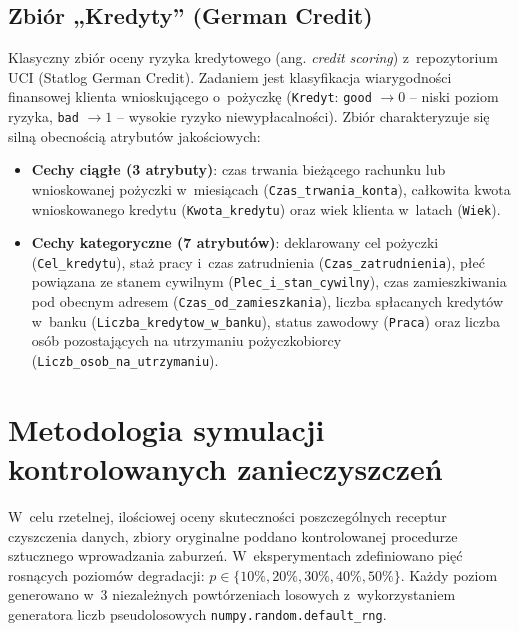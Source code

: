 \subsection{Zbiór „Kredyty” (German Credit)}
Klasyczny zbiór oceny ryzyka kredytowego (ang. \textit{credit scoring}) z~repozytorium UCI \cite{DuaGraff2017} (Statlog German Credit). Zadaniem jest klasyfikacja wiarygodności finansowej klienta wnioskującego o~pożyczkę (\texttt{Kredyt}: \texttt{good} $\rightarrow 0$ – niski poziom ryzyka, \texttt{bad} $\rightarrow 1$ – wysokie ryzyko niewypłacalności). Zbiór charakteryzuje się silną obecnością atrybutów jakościowych:
\begin{itemize}
    \item \textbf{Cechy ciągłe (3 atrybuty)}: czas trwania bieżącego rachunku lub wnioskowanej pożyczki w~miesiącach (\texttt{Czas\_trwania\_konta}), całkowita kwota wnioskowanego kredytu (\texttt{Kwota\_kredytu}) oraz wiek klienta w~latach (\texttt{Wiek}).
    \item \textbf{Cechy kategoryczne (7 atrybutów)}: deklarowany cel pożyczki (\texttt{Cel\_kredytu}), staż pracy i~czas zatrudnienia (\texttt{Czas\_zatrudnienia}), płeć powiązana ze stanem cywilnym (\texttt{Plec\_i\_stan\_cywilny}), czas zamieszkiwania pod obecnym adresem (\texttt{Czas\_od\_zamieszkania}), liczba spłacanych kredytów w~banku (\texttt{Liczba\_kredytow\_w\_banku}), status zawodowy (\texttt{Praca}) oraz liczba osób pozostających na utrzymaniu pożyczkobiorcy (\texttt{Liczb\_osob\_na\_utrzymaniu}).
\end{itemize}

\section{Metodologia symulacji kontrolowanych zanieczyszczeń}
W~celu rzetelnej, ilościowej oceny skuteczności poszczególnych receptur czyszczenia danych, zbiory oryginalne poddano kontrolowanej procedurze sztucznego wprowadzania zaburzeń. W~eksperymentach zdefiniowano pięć rosnących poziomów degradacji: $p \in \{10\%, 20\%, 30\%, 40\%, 50\%\}$. Każdy poziom generowano w~3 niezależnych powtórzeniach losowych z~wykorzystaniem generatora liczb pseudolosowych \texttt{numpy.random.default\_rng}.

